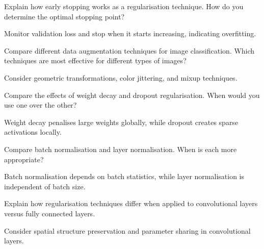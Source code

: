 \begin{exercisebox}[hard]
\begin{problem}
Explain how early stopping works as a regularisation technique. How do you determine the optimal stopping point?
\end{problem}
\begin{hintbox}
Monitor validation loss and stop when it starts increasing, indicating overfitting.
\end{hintbox}
\end{exercisebox}


\begin{exercisebox}[hard]
\begin{problem}
Compare different data augmentation techniques for image classification. Which techniques are most effective for different types of images?
\end{problem}
\begin{hintbox}
Consider geometric transformations, color jittering, and mixup techniques.
\end{hintbox}
\end{exercisebox}


\begin{exercisebox}[hard]
\begin{problem}
Compare the effects of weight decay and dropout regularisation. When would you use one over the other?
\end{problem}
\begin{hintbox}
Weight decay penalises large weights globally, while dropout creates sparse activations locally.
\end{hintbox}
\end{exercisebox}


\begin{exercisebox}[hard]
\begin{problem}
Compare batch normalisation and layer normalisation. When is each more appropriate?
\end{problem}
\begin{hintbox}
Batch normalisation depends on batch statistics, while layer normalisation is independent of batch size.
\end{hintbox}
\end{exercisebox}


\begin{exercisebox}[hard]
\begin{problem}
Explain how regularisation techniques differ when applied to convolutional layers versus fully connected layers.
\end{problem}
\begin{hintbox}
Consider spatial structure preservation and parameter sharing in convolutional layers.
\end{hintbox}
\end{exercisebox}


